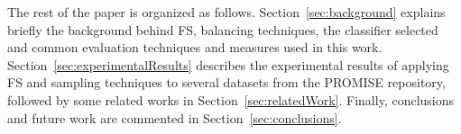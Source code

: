 \documentclass{elsart}
\begin{document}
The rest of the paper is organized as follows. Section~\ref{sec:background} explains briefly the background behind FS, balancing techniques, the classifier selected and common evaluation techniques and measures used in this work. Section~\ref{sec:experimentalResults} describes the experimental results of applying FS and sampling techniques to several datasets from the PROMISE repository, followed by some related works in Section~\ref{sec:relatedWork}. Finally, conclusions and future work are commented in Section~\ref{sec:conclusions}.


%
%
%
%
%
\end{document}
